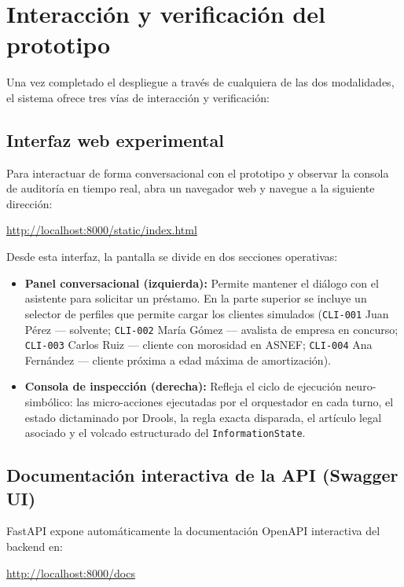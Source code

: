 \section{Interacción y verificación del prototipo}

Una vez completado el despliegue a través de cualquiera de las dos modalidades, el sistema ofrece tres vías de interacción y verificación:

\subsection{Interfaz web experimental}

Para interactuar de forma conversacional con el prototipo y observar la consola de auditoría en tiempo real, abra un navegador web y navegue a la siguiente dirección:

\begin{center}
\url{http://localhost:8000/static/index.html}
\end{center}

Desde esta interfaz, la pantalla se divide en dos secciones operativas:
\begin{itemize}
    \item \textbf{Panel conversacional (izquierda):} Permite mantener el diálogo con el asistente para solicitar un préstamo. En la parte superior se incluye un selector de perfiles que permite cargar los clientes simulados (\texttt{CLI-001} Juan Pérez — solvente; \texttt{CLI-002} María Gómez — avalista de empresa en concurso; \texttt{CLI-003} Carlos Ruiz — cliente con morosidad en ASNEF; \texttt{CLI-004} Ana Fernández — cliente próxima a edad máxima de amortización).
    \item \textbf{Consola de inspección (derecha):} Refleja el ciclo de ejecución neuro-simbólico: las micro-acciones ejecutadas por el orquestador en cada turno, el estado dictaminado por Drools, la regla exacta disparada, el artículo legal asociado y el volcado estructurado del \texttt{InformationState}.
\end{itemize}

\subsection{Documentación interactiva de la API (Swagger UI)}

FastAPI expone automáticamente la documentación OpenAPI interactiva del backend en:

\begin{center}
\url{http://localhost:8000/docs}
\end{center}

